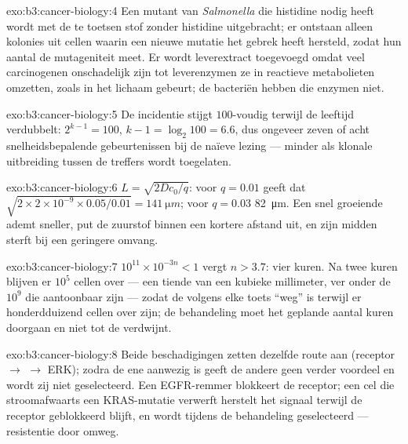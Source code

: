 \begin{solution}{exo:b3:cancer-biology:4}
Een mutant van \emph{Salmonella} die histidine nodig heeft wordt met de
te toetsen stof zonder histidine uitgebracht; er ontstaan alleen
kolonies uit cellen waarin een nieuwe mutatie het gebrek heeft
hersteld, zodat hun aantal de mutageniteit meet. Er wordt leverextract
toegevoegd omdat veel carcinogenen onschadelijk zijn tot leverenzymen
ze in reactieve metabolieten omzetten, zoals in het lichaam gebeurt; de
bacteriën hebben die enzymen niet.
\end{solution}

\begin{solution}{exo:b3:cancer-biology:5}
De incidentie stijgt $100$-voudig terwijl de leeftijd verdubbelt:
$2^{k-1} = 100$, $k - 1 =
\log_{2}100 = 6.6$, dus ongeveer zeven of acht snelheidsbepalende
gebeurtenissen bij de naïeve lezing --- minder als klonale uitbreiding
tussen de treffers wordt toegelaten.
\end{solution}

\begin{solution}{exo:b3:cancer-biology:6}
$L = \sqrt{2Dc_{0}/q}$: voor $q = 0.01$ geeft dat $\sqrt{2\times 2\times 10^{-9}
\times 0.05/0.01} = \qty{141}{\micro m}$; voor $q = 0.03$
\qty{82}{\micro m}. Een snel groeiende  ademt sneller, put de
zuurstof binnen een kortere afstand uit, en zijn midden sterft bij een
geringere omvang.
\end{solution}

\begin{solution}{exo:b3:cancer-biology:7}
$10^{11}\times 10^{-3n} < 1$ vergt $n > 3.7$: vier kuren. Na twee kuren
blijven er $10^{5}$ cellen over --- een tiende van een kubieke
millimeter, ver onder de $10^{9}$ die aantoonbaar zijn --- zodat de
 volgens elke toets ``weg'' is terwijl er honderdduizend cellen
over zijn; de behandeling moet het geplande aantal kuren doorgaan en
niet tot de  verdwijnt.
\end{solution}

\begin{solution}{exo:b3:cancer-biology:8}
Beide beschadigingen zetten dezelfde route aan (receptor $\to$ 
$\to$ ERK); zodra de ene aanwezig is geeft de andere geen verder
voordeel en wordt zij niet geselecteerd. Een EGFR-remmer blokkeert de
receptor; een cel die stroomafwaarts een KRAS-mutatie verwerft herstelt
het signaal terwijl de receptor geblokkeerd blijft, en wordt tijdens de
behandeling geselecteerd --- resistentie door omweg.
\end{solution}

